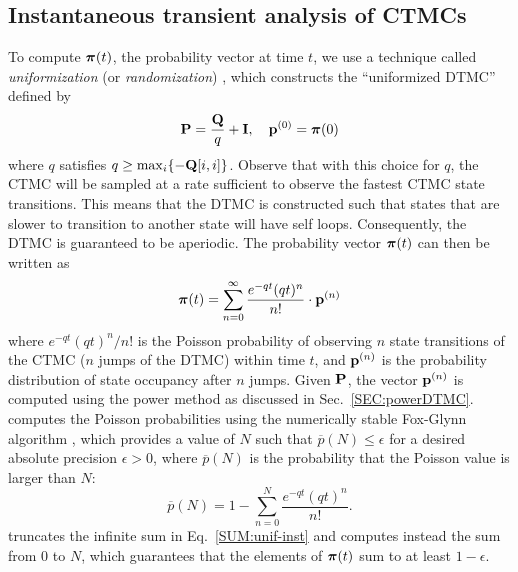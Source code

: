 \subsection{Instantaneous transient analysis of CTMCs}\label{SEC:inst-trans-anal-CTMC}
To compute $\gvect{\pi}(t)$, the probability vector at time $t$, we use a
technique called \emph{uniformization}
(or \emph{randomization})
\cite{Grassmann1991}, which constructs the ``uniformized DTMC'' defined by
\[
   \P = \frac{\Q}{q} + \I, \quad \vp^{(0)} = \vpi(0)
\]
where $q$ satisfies $q \ge \max_i\{-\Q[i,i]\}$.  Observe that with this
choice for $q$, the CTMC will be sampled at a rate sufficient to observe the
fastest CTMC state transitions.  This means that the DTMC is constructed such that
states that are slower to transition to another state will have self loops.
Consequently, the DTMC is guaranteed to be aperiodic.
The probability vector $\gvect{\pi}(t)$ can then be written as
\begin{equation}
  \gvect{\pi}(t) = \sum_{n=0}^{\infty} \frac{e^{-qt}(qt)^n}{n!}
     \cdot \vp^{(n)}
  \label{SUM:unif-inst}
\end{equation}
where ${e^{-qt}(qt)^n}/{n!}$ is the Poisson probability of
observing $n$ state transitions of the CTMC ($n$ jumps of the DTMC) within time $t$,
and $\vp^{(n)}$ is the probability distribution of state occupancy after $n$ jumps.
Given $\P$, the vector $\vp^{(n)}$ is computed using the power method as discussed
in Sec.~\ref{SEC:powerDTMC}. {\smart} computes the Poisson probabilities using the
numerically stable Fox-Glynn algorithm \cite{Fox1988}, 
which provides a value of $N$ such that
$\overline{p}(N) \le \epsilon$
for a desired absolute precision $\epsilon>0$,
where $\overline{p}(N)$ is the probability that the Poisson value is larger than $N$:
\[
  \overline{p}(N) = 1 - \sum_{n=0}^{N} \frac{e^{-qt}(qt)^n}{n!}.
\]
{\smart} truncates the infinite sum in Eq.~\ref{SUM:unif-inst}
and computes instead the sum from 0 to $N$,
which guarantees that the elements of $\gvect{\pi}(t)$
sum to at least $1-\epsilon$.



